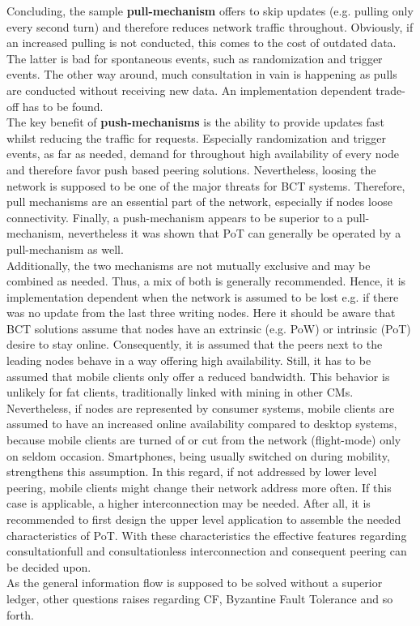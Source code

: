 \bigbreak

\noindent Concluding, the sample \textbf{pull-mechanism} offers to skip updates (e.g. pulling only every second turn) and therefore reduces network traffic throughout.
Obviously, if an increased pulling is not conducted, this comes to the cost of outdated data.
The latter is bad for spontaneous events, such as randomization and trigger events.
The other way around, much consultation in vain is happening as pulls are conducted without receiving new data.
An implementation dependent trade-off has to be found. \\
The key benefit of \textbf{push-mechanisms} is the ability to provide updates fast whilst reducing the traffic for requests.
Especially randomization and trigger events, as far as needed, demand for throughout high availability of every node
and therefore favor push based peering solutions.
Nevertheless, loosing the network is supposed to be one of the major threats for \gls{BCT} systems.
Therefore, pull mechanisms are an essential part of the network, especially if nodes loose connectivity.
Finally, a push-mechanism appears to be superior to a pull-mechanism, nevertheless it was shown
that \gls{PoT} can generally be operated by a pull-mechanism as well. \\
Additionally, the two mechanisms are not mutually exclusive and may be combined as needed.
Thus, a mix of both is generally recommended.
Hence, it is implementation dependent when the network is assumed to be lost e.g. if there was no update from the last three writing nodes.
Here it should be aware that \gls{BCT} solutions assume that nodes have an extrinsic (e.g. \gls{PoW}) or intrinsic (\gls{PoT}) desire to stay online.
Consequently, it is assumed that the peers next to the leading nodes behave in a way offering high availability.
Still, it has to be assumed that mobile clients only offer a reduced bandwidth.
This behavior is unlikely for fat clients, traditionally linked with mining in other \gls{CM}s.
Nevertheless, if nodes are represented by consumer systems, mobile clients are assumed to have an increased online availability
compared to desktop systems, because mobile clients are turned of or cut from the network (flight-mode) only on seldom occasion.
Smartphones, being usually switched on during mobility, strengthens this assumption.
In this regard, if not addressed by lower level peering, mobile clients might change their network address more often.
If this case is applicable, a higher interconnection may be needed.
After all, it is recommended to first design the upper level application to assemble the needed characteristics of \gls{PoT}.
With these characteristics the effective features regarding consultationfull and consultationless interconnection and consequent peering can be decided upon. \\
As the general information flow is supposed to be solved without a superior ledger,
other questions raises regarding \gls{CF}, Byzantine Fault Tolerance and so forth. \\



